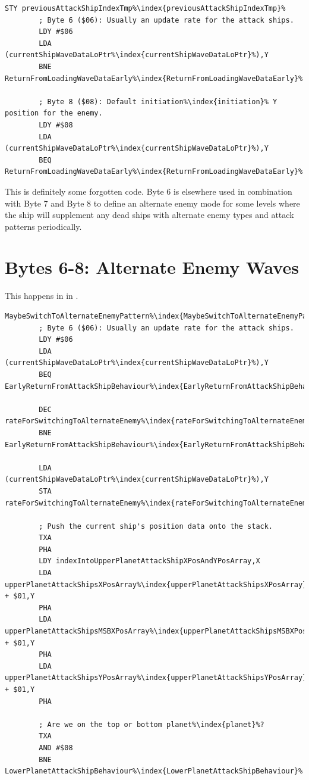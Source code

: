 \begin{lstlisting}[caption= An adjustment that never happens. Byte 6 and Byte 8 are never set in this way.,escapechar=\%]
        STY previousAttackShipIndexTmp%\index{previousAttackShipIndexTmp}%
        ; Byte 6 ($06): Usually an update rate for the attack ships.
        LDY #$06
        LDA (currentShipWaveDataLoPtr%\index{currentShipWaveDataLoPtr}%),Y
        BNE ReturnFromLoadingWaveDataEarly%\index{ReturnFromLoadingWaveDataEarly}%

        ; Byte 8 ($08): Default initiation%\index{initiation}% Y position for the enemy. 
        LDY #$08
        LDA (currentShipWaveDataLoPtr%\index{currentShipWaveDataLoPtr}%),Y
        BEQ ReturnFromLoadingWaveDataEarly%\index{ReturnFromLoadingWaveDataEarly}%
\end{lstlisting}

This is definitely some forgotten code. Byte 6 is elsewhere used in combination with Byte 7 and Byte 8 to define an alternate
enemy mode for some levels where the ship will supplement any dead ships with alternate enemy types and attack patterns periodically.


\section{Bytes 6-8: Alternate Enemy Waves}
This happens in  in . 

\begin{lstlisting}[caption=Byte 6 is used to periodically switch to an enemy mode defined by Bytes 7-8 ,escapechar=\%]
MaybeSwitchToAlternateEnemyPattern%\index{MaybeSwitchToAlternateEnemyPattern}%   
        ; Byte 6 ($06): Usually an update rate for the attack ships.
        LDY #$06
        LDA (currentShipWaveDataLoPtr%\index{currentShipWaveDataLoPtr}%),Y
        BEQ EarlyReturnFromAttackShipBehaviour%\index{EarlyReturnFromAttackShipBehaviour}%

        DEC rateForSwitchingToAlternateEnemy%\index{rateForSwitchingToAlternateEnemy}%,X
        BNE EarlyReturnFromAttackShipBehaviour%\index{EarlyReturnFromAttackShipBehaviour}%

        LDA (currentShipWaveDataLoPtr%\index{currentShipWaveDataLoPtr}%),Y
        STA rateForSwitchingToAlternateEnemy%\index{rateForSwitchingToAlternateEnemy}%,X

        ; Push the current ship's position data onto the stack.
        TXA
        PHA
        LDY indexIntoUpperPlanetAttackShipXPosAndYPosArray,X
        LDA upperPlanetAttackShipsXPosArray%\index{upperPlanetAttackShipsXPosArray}% + $01,Y
        PHA
        LDA upperPlanetAttackShipsMSBXPosArray%\index{upperPlanetAttackShipsMSBXPosArray}% + $01,Y
        PHA
        LDA upperPlanetAttackShipsYPosArray%\index{upperPlanetAttackShipsYPosArray}% + $01,Y
        PHA

        ; Are we on the top or bottom planet%\index{planet}%?
        TXA
        AND #$08
        BNE LowerPlanetAttackShipBehaviour%\index{LowerPlanetAttackShipBehaviour}%

\end{lstlisting}

